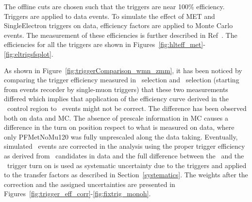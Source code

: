 The offline cuts are chosen such that the triggers are near 100\% efficiency. 
Triggers are applied to data events.
To simulate the effect of MET and SingleElectron triggers on data, efficiency factors are applied to Monte Carlo events.
The measurement of these efficiencies is further described in Ref~\cite{CMS_AN_2016-473}.
The efficiencies for all the triggers are shown in Figures~\ref{fig:hlteff_met}-\ref{fig:eltrigsfsplot}.

As shown in Figure~\ref{fig:triggerComparison_wmn_zmm}, it has been noticed by comparing the trigger efficiency measured in \Zmm~selection and \Wmn~selection (starting from events recorder by single-muon triggers) that these two measurements differed which implies that application of the efficiency curve derived in the \Wmn~control region to \Zmm~events might not be correct. The difference has been observed both on data and MC. The absence of prescale information in MC causes a difference in the turn on position respect to what is measured on data, where only PFMetNoMu120 was fully unprescaled along the data taking. Eventually, simulated \Zmm~events are corrected in the analysis using the proper trigger efficiency as derived from \Zmm~candidates in data and the full difference between the \Wmn~and the \Zmm~trigger turn on is used as systematic uncertainty due to the \MET triggers and applied to the transfer factors as described in Section~\ref{systematics}. The weights after the correction and the assigned uncertainties are presented in Figures~\ref{fig:trigger_eff_corr}-\ref{fig:fixtrig_monoh}.




